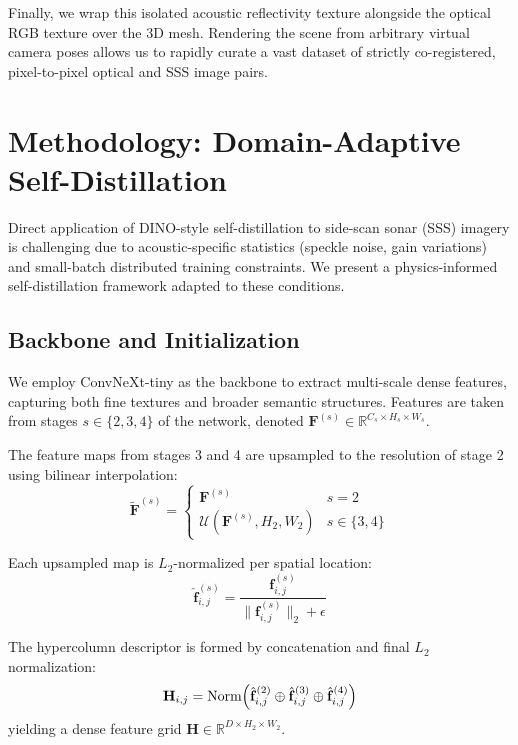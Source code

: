 \documentclass[12pt]{article}
\begin{document}
Finally, we wrap this isolated acoustic reflectivity texture alongside the optical RGB texture over the 3D mesh. Rendering the scene from arbitrary virtual camera poses allows us to rapidly curate a vast dataset of strictly co-registered, pixel-to-pixel optical and SSS image pairs.

\section{Methodology: Domain-Adaptive Self-Distillation}

Direct application of DINO-style self-distillation to side-scan sonar (SSS) imagery is challenging due to acoustic-specific statistics (speckle noise, gain variations) and small-batch distributed training constraints. We present a physics-informed self-distillation framework adapted to these conditions.

\subsection{Backbone and Initialization}
We employ ConvNeXt-tiny \cite{liu2022} as the backbone to extract multi-scale dense features, capturing both fine textures and broader semantic structures. Features are taken from stages $s \in \{2, 3, 4\}$ of the network, denoted $\mathbf{F}^{(s)} \in \mathbb{R}^{C_s \times H_s \times W_s}$.

The feature maps from stages 3 and 4 are upsampled to the resolution of stage 2 using bilinear interpolation:
\begin{equation}
\tilde{\mathbf{F}}^{(s)} = 
\begin{cases} 
\mathbf{F}^{(s)} & s = 2 \\
\mathcal{U}(\mathbf{F}^{(s)}, H_2, W_2) & s \in \{3, 4\}
\end{cases}
\end{equation}

Each upsampled map is $L_2$-normalized per spatial location:
\begin{equation}
\hat{\mathbf{f}}^{(s)}_{i,j} = \frac{\mathbf{f}^{(s)}_{i,j}}{\| \mathbf{f}^{(s)}_{i,j} \|_2 + \epsilon}
\end{equation}

The hypercolumn descriptor is formed by concatenation and final $L_2$ normalization:
\begin{equation}
\mathbf{H}_{i,j} = \text{Norm}\Bigl( \hat{\mathbf{f}}^{(2)}_{i,j} \oplus \hat{\mathbf{f}}^{(3)}_{i,j} \oplus \hat{\mathbf{f}}^{(4)}_{i,j} \Bigr)
\end{equation}
yielding a dense feature grid $\mathbf{H} \in \mathbb{R}^{D \times H_2 \times W_2}$.
\end{document}
